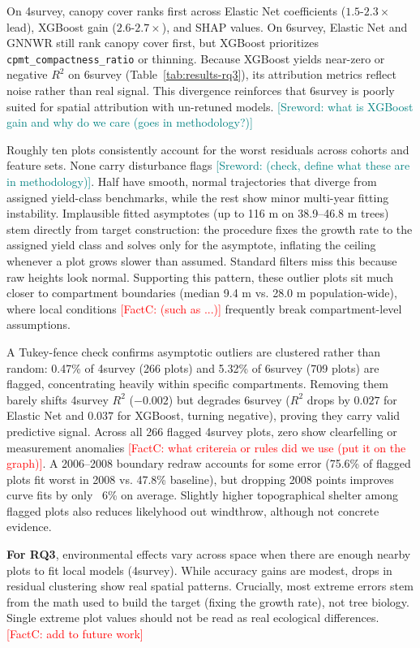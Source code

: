 \documentclass[logo,msc,ai]{infthesis}           %
\newcommand{\fc}[1]{\textcolor{red}{[FactC: #1]}}
\newcommand{\sr}[1]{\textcolor{teal}{[Sreword: #1]}}
\begin{document}
On 4survey, canopy cover ranks first across Elastic Net coefficients ($1.5\text{-}2.3\times$ lead), XGBoost gain ($2.6\text{-}2.7 \times $), and SHAP values. On 6survey, Elastic Net and GNNWR still rank canopy cover first, but XGBoost prioritizes \texttt{cpmt\_compactness\_ratio} or thinning. Because XGBoost yields near-zero or negative $R^2$ on 6survey (Table~\ref{tab:results-rq3}), its attribution metrics reflect noise rather than real signal. This divergence reinforces that 6survey is poorly suited for spatial attribution with un-retuned models. \sr{what is XGBoost gain and why do we care (goes in methodology?)}

Roughly ten plots consistently account for the worst residuals across cohorts and feature sets. None carry disturbance flags \sr{(check, define what these are in methodology)}. Half have smooth, normal trajectories that diverge from assigned yield-class benchmarks, while the rest show minor multi-year fitting instability. Implausible fitted asymptotes (up to 116 m on 38.9–46.8 m trees) stem directly from target construction: the procedure fixes the growth rate to the assigned yield class and solves only for the asymptote, inflating the ceiling whenever a plot grows slower than assumed. Standard filters miss this because raw heights look normal. Supporting this pattern, these outlier plots sit much closer to compartment boundaries (median 9.4 m vs. 28.0 m population-wide), where local conditions \fc{(such as ...)} frequently break compartment-level assumptions.


A Tukey-fence check confirms asymptotic outliers are clustered rather than random: 0.47\% of 4survey (266 plots) and 5.32\% of 6survey (709 plots) are flagged, concentrating heavily within specific compartments. Removing them barely shifts 4survey $R^2$ ($-0.002$) but degrades 6survey ($R^2$ drops by $0.027$ for Elastic Net and $0.037$ for XGBoost, turning negative), proving they carry valid predictive signal. Across all 266 flagged 4survey plots, zero show clearfelling or measurement anomalies \fc{what critereia or rules did we use (put it on the graph)}. A 2006–2008 boundary redraw accounts for some error (75.6\% of flagged plots fit worst in 2008 vs. 47.8\% baseline), but dropping 2008 points improves curve fits by only ~6\% on average. Slightly higher topographical shelter among flagged plots also reduces likelyhood out windthrow, although not concrete evidence. 

\textbf{For RQ3}, environmental effects vary across space when there are enough nearby plots to fit local models (4survey). While accuracy gains are modest, drops in residual clustering show real spatial patterns. Crucially, most extreme errors stem from the math used to build the target (fixing the growth rate), not tree biology. Single extreme plot values should not be read as real ecological differences. \fc{add to future work}
\end{document}

